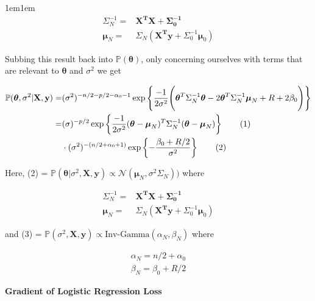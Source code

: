 \documentclass[11pt]{article}
\newcommand\numberthis{\addtocounter{equation}{1}\tag{\theequation}}
\begin{document}
\begin{adjustwidth}{1em}{1em}
        \begin{align*}
            \Sigma_N^{-1} = & \mathbf{X^TX + \Sigma_0^{-1}} \\ 
            \boldsymbol{\mu}_N =& \Sigma_N(\mathbf{X^Ty} + \Sigma_0^{-1}\boldsymbol{\mu}_0)
        \end{align*}

        Subbing this result back into $\mathbb{P}(\boldsymbol{\theta})$, only concerning ourselves
        with terms that are relevant to $\boldsymbol{\theta}$ and $\sigma^2$ we get

        \begin{align*}
            \mathbb{P}(\boldsymbol{\theta}, \sigma^2 | \mathbf{X,y})
            =& (\sigma^2)^{-n / 2 - p / 2 - \alpha_0 - 1} \exp\left\{\frac{-1}{2\sigma^2}\Bigg(
            \boldsymbol{\theta}^T \Sigma_N^{-1} \boldsymbol{\theta} - 2\boldsymbol{\theta}^T
            \Sigma_N^{-1} \boldsymbol{\mu}_N + R + 2\beta_0\Bigg)\right\} \\ 
            =& (\sigma)^{- p /2} \exp \left\{\frac{-1}{2\sigma^2}(\boldsymbol{\theta} -
            \boldsymbol{\mu}_N)^T \Sigma_N^{-1}(\boldsymbol{\theta} - \boldsymbol{\mu}_N)
            \right\} \numberthis \\ 
             & \cdot (\sigma^2)^{- (n / 2 + \alpha_0 + 1)} \exp\left\{- \frac{\beta_0 + R / 2}
            {\sigma^2}\right\} \numberthis
        \end{align*}

        Here, (2) = $\mathbb{P}(\boldsymbol{\theta} | \sigma^2, \mathbf{X, y}) \propto
        \mathcal{N}(\boldsymbol{\mu}_N, \sigma^2 \Sigma_N))$ where 

        \begin{align*}
            \Sigma_N^{-1} = & \mathbf{X^TX + \Sigma_0^{-1}} \\ 
            \boldsymbol{\mu}_N =& \Sigma_N(\mathbf{X^Ty} + \Sigma_0^{-1}\boldsymbol{\mu}_0)
        \end{align*}

        and (3) = $\mathbb{P}(\sigma^2, \mathbf{X, y}) \propto \text{Inv-Gamma}(\alpha_N, \beta_N)$
        where 

        \begin{align*}
            \alpha_N = n / 2 + \alpha_0 \\ 
            \beta_N = \beta_0 + R / 2
        \end{align*}
    \end{adjustwidth}

    \newpage
    \textbf{Gradient of Logistic Regression Loss} 
\end{document}
